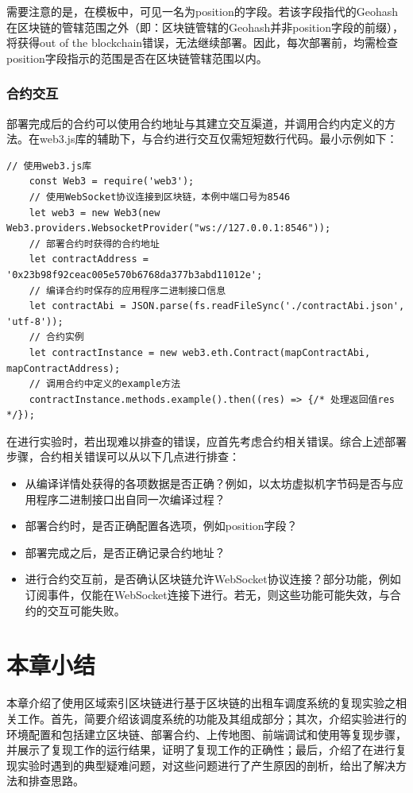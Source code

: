 需要注意的是，在模板中，可见一名为position的字段。若该字段指代的Geohash在区块链的管辖范围之外（即：区块链管辖的Geohash并非position字段的前缀），将获得out of the blockchain错误，无法继续部署。因此，每次部署前，均需检查position字段指示的范围是否在区块链管辖范围以内。

\subsubsection{合约交互}

部署完成后的合约可以使用合约地址与其建立交互渠道，并调用合约内定义的方法。在web3.js库的辅助下，与合约进行交互仅需短短数行代码。最小示例如下：

\begin{lstlisting}[caption={合约交互}, label={lst:合约交互}]
    // 使用web3.js库
    const Web3 = require('web3');
    // 使用WebSocket协议连接到区块链，本例中端口号为8546
    let web3 = new Web3(new Web3.providers.WebsocketProvider("ws://127.0.0.1:8546"));
    // 部署合约时获得的合约地址
    let contractAddress = '0x23b98f92ceac005e570b6768da377b3abd11012e';
    // 编译合约时保存的应用程序二进制接口信息
    let contractAbi = JSON.parse(fs.readFileSync('./contractAbi.json', 'utf-8'));
    // 合约实例
    let contractInstance = new web3.eth.Contract(mapContractAbi, mapContractAddress);
    // 调用合约中定义的example方法
    contractInstance.methods.example().then((res) => {/* 处理返回值res */});
\end{lstlisting}

在进行实验时，若出现难以排查的错误，应首先考虑合约相关错误。综合上述部署步骤，合约相关错误可以从以下几点进行排查：

\begin{itemize}
    \item 从编译详情处获得的各项数据是否正确？例如，以太坊虚拟机字节码是否与应用程序二进制接口出自同一次编译过程？
    \item 部署合约时，是否正确配置各选项，例如position字段？
    \item 部署完成之后，是否正确记录合约地址？
    \item 进行合约交互前，是否确认区块链允许WebSocket协议连接？部分功能，例如订阅事件，仅能在WebSocket连接下进行。若无，则这些功能可能失效，与合约的交互可能失败。
\end{itemize}

\section{本章小结}

本章介绍了使用区域索引区块链进行基于区块链的出租车调度系统的复现实验之相关工作。首先，简要介绍该调度系统的功能及其组成部分；其次，介绍实验进行的环境配置和包括建立区块链、部署合约、上传地图、前端调试和使用等复现步骤，并展示了复现工作的运行结果，证明了复现工作的正确性；最后，介绍了在进行复现实验时遇到的典型疑难问题，对这些问题进行了产生原因的剖析，给出了解决方法和排查思路。
